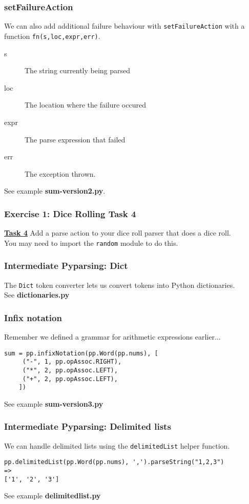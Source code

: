 \documentclass{beamer}
\begin{document}
\begin{frame}
\frametitle{setFailureAction}
We can also add additional failure behaviour with \texttt{setFailureAction} with a function \texttt{fn(s,loc,expr,err)}. \\
\begin{description}
\item[s] The string currently being parsed
\item[loc] The location where the failure occured
\item[expr] The parse expression that failed
\item[err] The exception thrown.
\end{description}
\medskip
See example \textbf{sum-version2.py}.
\end{frame}


\begin{frame}
\frametitle{Exercise 1: Dice Rolling Task 4}
\textbf{\underline{Task 4}} Add a parse action to your dice roll parser that does a dice roll. \\
\medskip
You may need to import the \texttt{random} module to do this.
\end{frame}

\begin{frame}
\frametitle{Intermediate Pyparsing: Dict}
The \texttt{Dict} token converter lets us convert tokens into Python dictionaries. \\
\bigskip
See \textbf{dictionaries.py}

\end{frame}

\begin{frame}[fragile]
\frametitle{Infix notation}
Remember we defined a grammar for arithmetic expressions earlier...
\begin{verbatim}
sum = pp.infixNotation(pp.Word(pp.nums), [
     ("-", 1, pp.opAssoc.RIGHT),
     ("*", 2, pp.opAssoc.LEFT),
     ("+", 2, pp.opAssoc.LEFT),
    ])
\end{verbatim}
See example \textbf{sum-version3.py}
\end{frame}

\begin{frame}[fragile]
\frametitle{Intermediate Pyparsing: Delimited lists}
We can handle delimited lists using the \texttt{delimitedList} helper function. \\
\begin{verbatim}
pp.delimitedList(pp.Word(pp.nums), ',').parseString("1,2,3")
=>
['1', '2', '3']
\end{verbatim}

\bigskip
See example \textbf{delimitedlist.py}

\end{frame}
\end{document}
